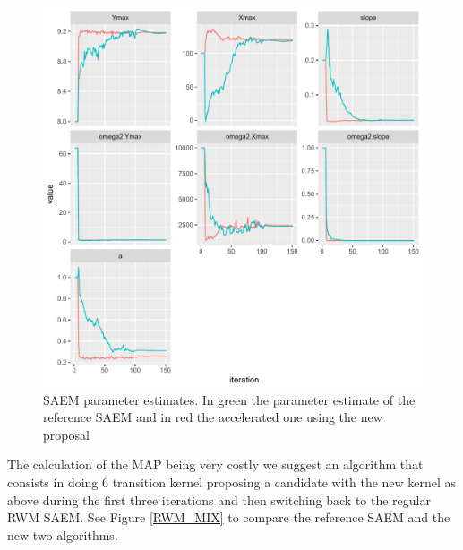 \documentclass{article}
\begin{document}
\begin{appendices}
\begin{figure}[ht]
\label{RWM_MAP}
\vskip 0.2in
\begin{center}
\centerline{\includegraphics[width=\columnwidth]{map_yield.pdf}}
\caption{SAEM parameter estimates. In green the parameter estimate of the reference SAEM and in red the accelerated one using the new proposal}
\label{new}
\end{center}
\vskip -0.2in
\end{figure} 

The calculation of the MAP being very costly we suggest an algorithm that consists in doing 6 transition kernel proposing a candidate with the new kernel as above during the first three iterations and then switching back to the regular RWM SAEM. See Figure \ref{RWM_MIX} to compare the reference SAEM and the new two algorithms.



\end{appendices}
\end{document}
